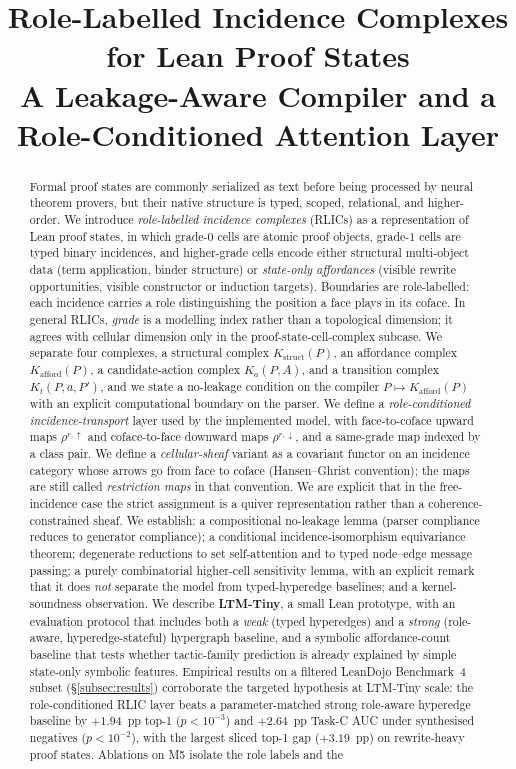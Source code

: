 \documentclass[11pt]{article}
\title{
Role-Labelled Incidence Complexes for Lean Proof States
\\[0.5em]
\large A Leakage-Aware Compiler and a Role-Conditioned Attention Layer
}
\author{}
\date{}
\theoremstyle{definition}
\theoremstyle{plain}
\newcommand{\Kstruct}{K_{\mathrm{struct}}}
\newcommand{\Kafford}{K_{\mathrm{afford}}}
\begin{document}
\maketitle

\begin{abstract}
Formal proof states are commonly serialized as text before being processed by neural theorem provers, but their native structure is typed, scoped, relational, and higher-order. We introduce \emph{role-labelled incidence complexes} (RLICs) as a representation of Lean proof states, in which grade-$0$ cells are atomic proof objects, grade-$1$ cells are typed binary incidences, and higher-grade cells encode either structural multi-object data (term application, binder structure) or \emph{state-only affordances} (visible rewrite opportunities, visible constructor or induction targets). Boundaries are role-labelled: each incidence carries a role distinguishing the position a face plays in its coface. In general RLICs, \emph{grade} is a modelling index rather than a topological dimension; it agrees with cellular dimension only in the proof-state-cell-complex subcase. We separate four complexes, a structural complex $\Kstruct(P)$, an affordance complex $\Kafford(P)$, a candidate-action complex $K_a(P,A)$, and a transition complex $K_t(P,a,P')$, and we state a no-leakage condition on the compiler $P \mapsto \Kafford(P)$ with an explicit computational boundary on the parser. We define a \emph{role-conditioned incidence-transport} layer used by the implemented model, with face-to-coface upward maps $\rho^{r,\uparrow}$ and coface-to-face downward maps $\rho^{r,\downarrow}$, and a same-grade map indexed by a class pair. We define a \emph{cellular-sheaf} variant as a covariant functor on an incidence category whose arrows go from face to coface (Hansen--Ghrist convention); the maps are still called \emph{restriction maps} in that convention. We are explicit that in the free-incidence case the strict assignment is a quiver representation rather than a coherence-constrained sheaf. We establish: a compositional no-leakage lemma (parser compliance reduces to generator compliance); a conditional incidence-isomorphism equivariance theorem; degenerate reductions to set self-attention and to typed node--edge message passing; a purely combinatorial higher-cell sensitivity lemma, with an explicit remark that it does \emph{not} separate the model from typed-hyperedge baselines; and a kernel-soundness observation. We describe \textbf{LTM-Tiny}, a small Lean prototype, with an evaluation protocol that includes both a \emph{weak} (typed hyperedges) and a \emph{strong} (role-aware, hyperedge-stateful) hypergraph baseline, and a symbolic affordance-count baseline that tests whether tactic-family prediction is already explained by simple state-only symbolic features. Empirical results on a filtered LeanDojo Benchmark~4 subset (\S\ref{subsec:results}) corroborate the targeted hypothesis at LTM-Tiny scale: the role-conditioned RLIC layer beats a parameter-matched strong role-aware hyperedge baseline by $+1.94$~pp top-1 ($p < 10^{-3}$) and $+2.64$~pp Task-C AUC under synthesised negatives ($p < 10^{-2}$), with the largest sliced top-1 gap ($+3.19$~pp) on rewrite-heavy proof states. Ablations on M5 isolate the role labels and the 
\end{abstract}
\end{document}
